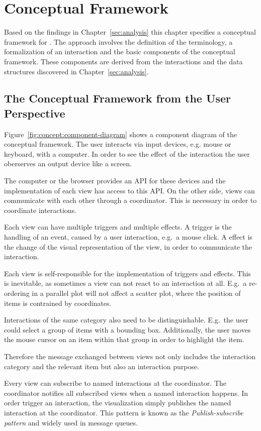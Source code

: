 \chapter{Conceptual Framework}\label{sec:concept}
Based on the findings in Chapter~\ref{sec:analysis} this chapter specifies a conceptual framework for \cmvs{}.
The approach involves the definition of the terminology, a formalization of an interaction and the basic components of the conceptual framework.
These components are derived from the interactions and the data structures discovered in Chapter~\ref{sec:analysis}.

\section{The Conceptual Framework from the User Perspective}

Figure~\ref{fig:concept:component-diagram} shows a component diagram of the conceptual framework.
The user interacts via input devices, e.g. mouse or keyboard, with a computer.
In order to see the effect of the interaction the user oberserves an output device like a screen.

The computer or the browser provides an API for these devices and the implementation of each view has access to this API.
On the other side, views can communicate with each other through a coordinator.
This is necessary in order to coordinate interactions.

Each view can have multiple triggers and multiple effects.
A trigger is the handling of an event, caused by a user interaction, e.g.\ a mouse click.
A effect is the change of the visual representation of the view, in order to communicate the interaction.

Each view is self-responsible for the implementation of triggers and effects.
This is inevitable, as sometimes a view can not react to an interaction at all.
E.g.\ a re-ordering in a parallel plot will not affect a scatter plot, where the position of items is contrained by coordinates.

Interactions of the same category also need to be distinguishable.
E.g.\ the user could select a group of items with a bounding box.
Additionally, the user moves the mouse cursor on an item within that group in order to highlight the item.

Therefore the message exchanged between views not only includes the interaction category and the relevant item but also an interaction purpose.

Every view can subscribe to named interactions at the coordinator.
The coordinator notifies all subscribed views when a named interaction happens.
In order trigger an interaction, the visualization simply publishes the named interaction at the coordinator.
This pattern is known as the \emph{Publish-subscribe pattern} and widely used in message queues.


